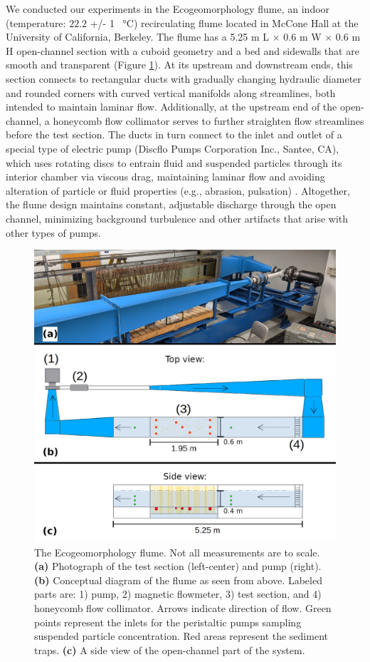 \documentclass[geosciences,article,submit,moreauthors,pdftex]{Definitions/mdpi}
\begin{document}
We conducted our experiments in the Ecogeomorphology flume, an indoor (temperature: $22.2$ +/- 1 \SI{}{\celsius}) recirculating flume located in McCone Hall at the University of California, Berkeley. The flume has a 5.25 m L $\times$ 0.6 m W $\times$ 0.6 m H open-channel section with a cuboid geometry and a bed and sidewalls that are smooth and transparent (Figure \ref{fig:floorplan}). At its upstream and downstream ends, this section connects to rectangular ducts with gradually changing hydraulic diameter and rounded corners with curved vertical manifolds along streamlines, both intended to maintain laminar flow. Additionally, at the upstream end of the open-channel, a honeycomb flow collimator serves to further straighten flow streamlines before the test section. The ducts in turn connect to the inlet and outlet of a special type of electric pump (Discflo Pumps Corporation Inc., Santee, CA), which uses rotating discs to entrain fluid and suspended particles through its interior chamber via viscous drag, maintaining laminar flow and avoiding alteration of particle or fluid properties (e.g., abrasion, pulsation) \cite{discflo}. Altogether, the flume design maintains constant, adjustable discharge through the open channel, minimizing background turbulence and other artifacts that arise with other types of pumps.

\begin{figure}[H]
\includegraphics[width=5in]{../pics/flume_with_sedtraps.png}
\centering
\caption{The Ecogeomorphology flume. Not all measurements are to scale. \textbf{(a)} Photograph of the test section (left-center) and pump (right). \textbf{(b)} Conceptual diagram of the flume as seen from above. Labeled parts are: 1) pump, 2) magnetic flowmeter, 3) test section, and 4) honeycomb flow collimator. Arrows indicate direction of flow. Green points represent the inlets for the peristaltic pumps sampling suspended particle concentration. Red areas represent the sediment traps. \textbf{(c)} A side view of the open-channel part of the system.}
\label{fig:floorplan}
\end{figure}
\end{document}
